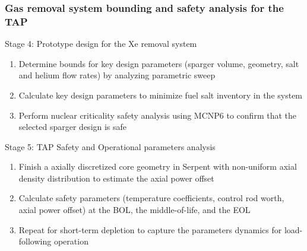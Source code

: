 \begin{frame}
\frametitle{Gas removal system bounding and safety analysis for the TAP}
\begin{block}{Stage 4: Prototype design for the Xe removal system}
	\begin{enumerate}
		\item Determine bounds for key design parameters (sparger volume, 
		geometry, salt and helium flow rates) by analyzing parametric sweep
		\item Calculate key design parameters to minimize fuel salt inventory 
		in the system
		\item Perform nuclear criticality safety analysis using MCNP6 
		\cite{werner_mcnp6._2018} to
confirm that the selected 
		sparger design is safe
	\end{enumerate}
\end{block}

\begin{block}{Stage 5: \gls{TAP} Safety and Operational parameters analysis}
	\begin{enumerate}
		\item Finish a axially discretized core
geometry in Serpent with 
		non-uniform axial density distribution to estimate the axial power
		offset
		\item Calculate safety parameters (temperature coefficients, control 
		rod worth, axial power offset) at the \gls{BOL}, the middle-of-life, 
		and the \gls{EOL}
		\item Repeat for short-term depletion to capture the parameters 
		dynamics for load-following operation
	\end{enumerate}
\end{block}
\end{frame}


